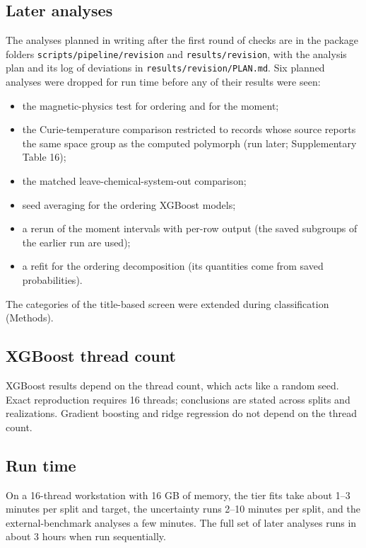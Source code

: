\documentclass[pdflatex,sn-nature]{sn-jnl}
\begin{document}
\subsection{Later analyses}
The analyses planned in writing after the first round of checks are in the package folders \texttt{scripts/pipeline/revision} and \texttt{results/revision}, with the analysis plan and its log of deviations in \texttt{results/revision/PLAN.md}. Six planned analyses were dropped for run time before any of their results were seen:
\begin{itemize}
\item the magnetic-physics test for ordering and for the moment;
\item the Curie-temperature comparison restricted to records whose source reports the same space group as the computed polymorph (run later; Supplementary Table 16);
\item the matched leave-chemical-system-out comparison;
\item seed averaging for the ordering XGBoost models;
\item a rerun of the moment intervals with per-row output (the saved subgroups of the earlier run are used);
\item a refit for the ordering decomposition (its quantities come from saved probabilities).
\end{itemize}
The categories of the title-based screen were extended during classification (Methods).

\subsection{XGBoost thread count}
XGBoost results depend on the thread count, which acts like a random seed. Exact reproduction requires 16 threads; conclusions are stated across splits and realizations. Gradient boosting and ridge regression do not depend on the thread count.

\subsection{Run time}
On a 16-thread workstation with 16 GB of memory, the tier fits take about 1--3 minutes per split and target, the uncertainty runs 2--10 minutes per split, and the external-benchmark analyses a few minutes. The full set of later analyses runs in about 3 hours when run sequentially.
\end{document}
